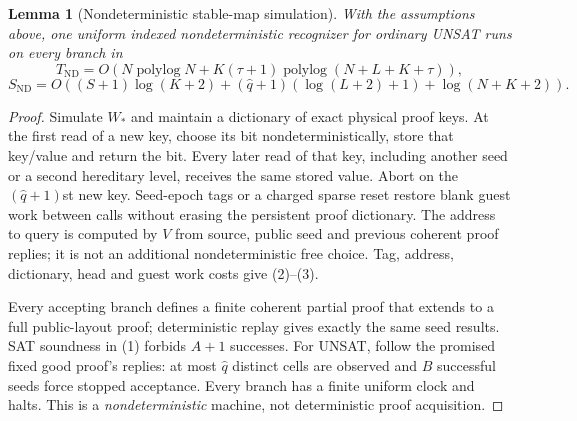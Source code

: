 \documentclass[11pt]{article}
\newtheorem{lemma}[theorem]{Lemma}
\begin{document}
\begin{lemma}[Nondeterministic stable-map simulation]
With the assumptions above, one uniform indexed nondeterministic recognizer for ordinary UNSAT runs on every branch in
\[
T_{\mathrm{ND}}=O\!\left(N\operatorname{polylog}N+
K(\tau+1)\operatorname{polylog}(N+L+K+\tau)\right),\tag{2}
\]
\[
S_{\mathrm{ND}}=O\!\left((S+1)\log(K+2)+
(\widehat q+1)(\log(L+2)+1)+\log(N+K+2)\right).\tag{3}
\]
\end{lemma}
\begin{proof}
Simulate $W_*$ and maintain a dictionary of exact physical proof keys. At the first read of a new key, choose its bit nondeterministically, store that key/value and return the bit. Every later read of that key, including another seed or a second hereditary level, receives the same stored value. Abort on the $(\widehat q+1)$st new key. Seed-epoch tags or a charged sparse reset restore blank guest work between calls without erasing the persistent proof dictionary. The address to query is computed by $V$ from source, public seed and previous coherent proof replies; it is not an additional nondeterministic free choice. Tag, address, dictionary, head and guest work costs give (2)--(3).

Every accepting branch defines a finite coherent partial proof that extends to a full public-layout proof; deterministic replay gives exactly the same seed results. SAT soundness in (1) forbids $A+1$ successes. For UNSAT, follow the promised fixed good proof's replies: at most $\widehat q$ distinct cells are observed and $B$ successful seeds force stopped acceptance. Every branch has a finite uniform clock and halts. This is a \emph{nondeterministic} machine, not deterministic proof acquisition.
\end{proof}
\end{document}
